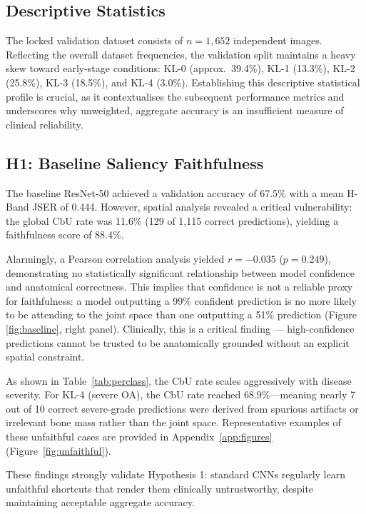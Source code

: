 \documentclass[conference]{IEEEtran}
\begin{document}
\subsection{Descriptive Statistics}
The locked validation dataset consists of $n = 1,652$ independent images. Reflecting the overall dataset frequencies, the validation split maintains a heavy skew toward early-stage conditions: KL-0 (approx.\ 39.4\%), KL-1 (13.3\%), KL-2 (25.8\%), KL-3 (18.5\%), and KL-4 (3.0\%). Establishing this descriptive statistical profile is crucial, as it contextualises the subsequent performance metrics and underscores why unweighted, aggregate accuracy is an insufficient measure of clinical reliability.

\subsection{H1: Baseline Saliency Faithfulness}
The baseline ResNet-50 achieved a validation accuracy of 67.5\% with a mean H-Band JSER of 0.444. However, spatial analysis revealed a critical vulnerability: the global CbU rate was 11.6\% (129 of 1,115 correct predictions), yielding a faithfulness score of 88.4\%.

Alarmingly, a Pearson correlation analysis yielded $r = -0.035$ ($p = 0.249$), demonstrating no statistically significant relationship between model confidence and anatomical correctness. This implies that confidence is not a reliable proxy for faithfulness: a model outputting a 99\% confident prediction is no more likely to be attending to the joint space than one outputting a 51\% prediction (Figure \ref{fig:baseline}, right panel). Clinically, this is a critical finding — high-confidence predictions cannot be trusted to be anatomically grounded without an explicit spatial constraint.

As shown in Table~\ref{tab:perclass}, the CbU rate scales aggressively with disease severity. For KL-4 (severe OA), the CbU rate reached 68.9\%—meaning nearly 7 out of 10 correct severe-grade predictions were derived from spurious artifacts or irrelevant bone mass rather than the joint space. Representative examples of these unfaithful cases are provided in Appendix~\ref{app:figures} (Figure~\ref{fig:unfaithful}).

These findings strongly validate Hypothesis 1: standard CNNs regularly learn unfaithful shortcuts that render them clinically untrustworthy, despite maintaining acceptable aggregate accuracy.

\end{document}
